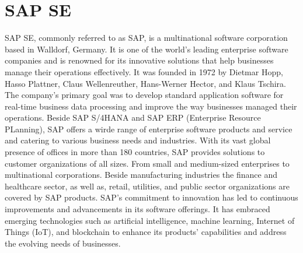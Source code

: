 \section{SAP SE}
\label{ch:Introduction:sec:SAP SE}
SAP SE, commonly referred to as SAP, is a multinational software corporation based in Walldorf, Germany. It is one of the world's leading enterprise software companies and is renowned for its innovative solutions that help businesses manage their operations effectively. It was founded in 1972 by Dietmar Hopp, Hasso Plattner, Claus Wellenreuther, Hans-Werner Hector, and Klaus Tschira. The company's primary goal was to develop standard application software for real-time business data processing and improve the way businesses managed their operations. Beside SAP S/4HANA and SAP ERP (Enterprise Resource PLanning), SAP offers a wirde range of enterprise software products and service and catering to various business needs and industries.
With its vast global presence of offices in more than 180 countries, SAP provides solutions to customer organizations of all sizes. From small and medium-sized enterprises to multinational corporations. Beside manufacturing industries the finance and healthcare sector, as well as, retail, utilities, and public sector organizations are covered by SAP products. SAP's commitment to innovation has led to continuous improvements and advancements in its software offerings. It has embraced emerging technologies such as artificial intelligence, machine learning, Internet of Things (IoT), and blockchain to enhance its products' capabilities and address the evolving needs of businesses.


